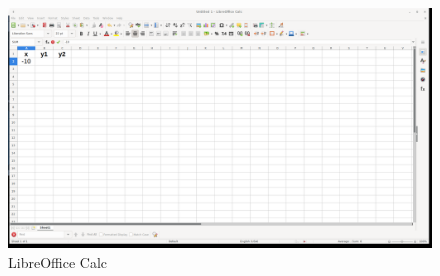 \begin{figure}[h!]		
	\centering
   	\includegraphics[width=8.0in]{pictures/picture_004.png}
  	\caption{LibreOffice Calc}
   	\label{fig:LibreOfficeCalc004}
\end{figure}